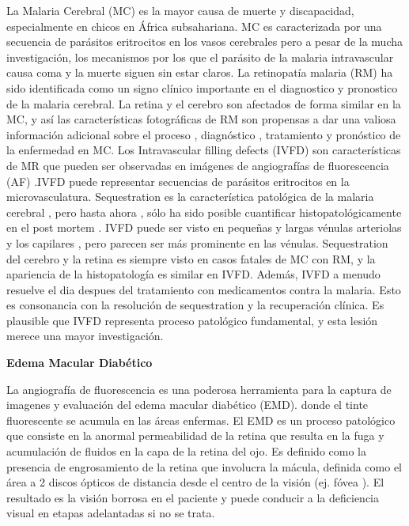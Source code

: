 La Malaria Cerebral (MC) es la mayor causa de muerte y discapacidad, especialmente en chicos en África subsahariana. MC es caracterizada por una secuencia de parásitos eritrocitos
en los vasos cerebrales pero a pesar de la mucha  investigación, los mecanismos por los que el parásito de la malaria intravascular causa coma y la muerte siguen sin estar claros.
La retinopatía  malaria (RM) ha sido identificada como un signo clínico importante en el diagnostico y pronostico de la malaria cerebral. La retina y el cerebro son afectados de forma similar en la MC, y así las características fotográficas de RM son propensas a dar una valiosa información adicional sobre el proceso , diagnóstico , tratamiento y pronóstico de la enfermedad en MC.
Los Intravascular filling defects (IVFD) son características de  MR que pueden ser observadas en imágenes de  angiografías de fluorescencia (AF) .IVFD puede representar secuencias de parásitos eritrocitos en la microvasculatura. Sequestration es la característica patológica de la malaria cerebral , pero hasta ahora , sólo ha sido posible cuantificar histopatológicamente en el post mortem . IVFD puede ser visto en pequeñas y largas vénulas arteriolas y los capilares , pero parecen ser más prominente en las vénulas. Sequestration del cerebro y la retina es siempre visto en casos fatales de MC con RM, y la apariencia de la histopatología es similar en IVFD. Además, IVFD a menudo resuelve el dia despues del tratamiento con medicamentos contra la malaria. Esto es consonancia con  la resolución de sequestration y la recuperación clínica. Es plausible que  IVFD representa proceso patológico fundamental, y esta lesión merece una mayor investigación. \cite{zhao2015automated}

\textbf{Edema Macular Diabético}

La angiografía de fluorescencia es una poderosa herramienta para la captura de imagenes y evaluación del edema macular diabético (EMD). donde el tinte fluorescente se acumula en las áreas enfermas. 
El EMD es un proceso patológico que consiste en la anormal permeabilidad de la retina que resulta en la fuga y acumulación de fluidos en la capa de la retina del ojo. Es definido como la presencia de engrosamiento de la retina que involucra la mácula, definida como el área a 2 discos ópticos de distancia desde el centro de la visión (ej. fóvea ). El resultado es la visión borrosa en el paciente y puede conducir a la deficiencia visual en etapas adelantadas si no se trata. \cite{el2011segmentation} 

